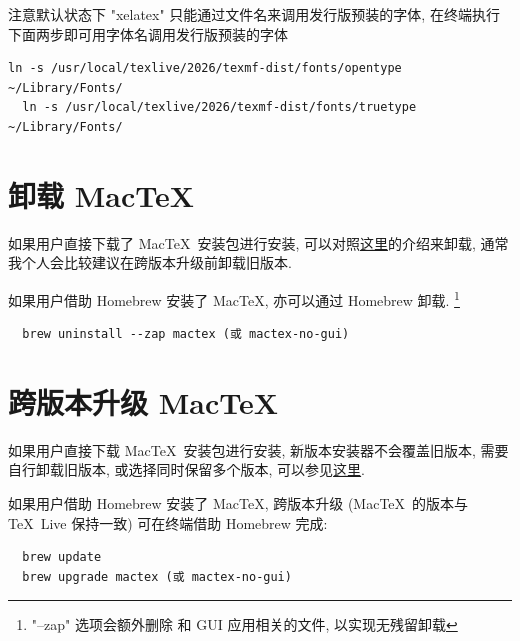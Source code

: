 注意默认状态下 "xelatex" 只能通过文件名来调用发行版预装的字体,
在\textsf{终端}执行下面两步即可用字体名调用发行版预装的字体
\begin{lstlisting}[deletekeywords = local]
  ln -s /usr/local/texlive/2026/texmf-dist/fonts/opentype ~/Library/Fonts/
  ln -s /usr/local/texlive/2026/texmf-dist/fonts/truetype ~/Library/Fonts/
\end{lstlisting}

\section{卸载 Mac\TeX}

如果用户直接下载了 Mac\TeX\ 安装包进行安装,
可以对照\href{https://www.tug.org/mactex/uninstalling.html}{这里}的介绍来卸载,
通常我个人会比较建议在跨版本升级前卸载旧版本.

如果用户借助 Homebrew 安装了 Mac\TeX,
亦可以通过 Homebrew 卸载.
\footnote{"--zap" 选项会额外删除  和 GUI 应用相关的文件, 以实现无残留卸载}
\begin{lstlisting}
  brew uninstall --zap mactex (或 mactex-no-gui)
\end{lstlisting}

\section{跨版本升级 Mac\TeX}

如果用户直接下载 Mac\TeX\ 安装包进行安装,
新版本安装器不会覆盖旧版本,
需要自行卸载旧版本,
或选择同时保留多个版本,
可以参见\href{https://www.tug.org/mactex/multipletexdistributions.html}{这里}.

如果用户借助 Homebrew 安装了 Mac\TeX,
跨版本升级 (Mac\TeX\ 的版本与 \TeX~Live 保持一致)
可在\textsf{终端}借助 Homebrew 完成:
\begin{lstlisting}
  brew update
  brew upgrade mactex (或 mactex-no-gui)
\end{lstlisting}
